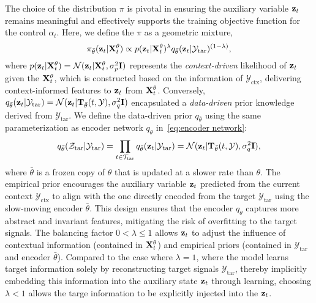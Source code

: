The choice of the distribution $\pi$ is pivotal in ensuring the auxiliary variable $\mathbf{z}_t$ remains meaningful and effectively supports the training objective function for the control $\alpha_t$. Here, we define the $\pi$ as a geometric mixture,
\[\label{eq:mixture distribution}
    \pi_{\bar{\theta}}(\mathbf{z}_t | \mathbf{X}^{\theta}_t) \propto p(\mathbf{z}_t | \mathbf{X}^{\theta}_t)^{\lambda} q_{\bar{\theta}}(\mathbf{z}_t | \mathcal{Y}_{\text{tar}})^{(1-\lambda)},
\]
where $p(\mathbf{z}_t | \mathbf{X}^{\theta}_t) = \mathcal{N}(\mathbf{z}_t | \mathbf{X}^{\theta}_t, \sigma^2_p \mathbf{I})$ represents the \textit{context-driven} likelihood of $\mathbf{z}_t$ given the $\mathbf{X}^{\theta}_t$, which is constructed based on the information of $\mathcal{Y}_{\text{ctx}}$, delivering context-informed features to $\mathbf{z}_t$ from $\mathbf{X}_t^\theta$. Conversely, $q_{\bar{\theta}}(\mathbf{z}_t | \mathcal{Y}_{\text{tar}}) = \mathcal{N}(\mathbf{z}_t | \mathbf{T}_{\bar{\theta}}(t, \mathcal{Y}), \sigma^2_q \mathbf{I})$ encapsulated a \textit{data-driven} prior knowledge derived from $\mathcal{Y}_{\text{tar}}$. We define the data-driven prior $q_{\bar{\theta}}$ using the same parameterization as encoder network $q_{\theta}$ in~\eqref{eq:encoder network}:
\[\nonumber
    q_{\bar{\theta}}(\mathcal{Z}_{\text{tar}} | \mathcal{Y}_{\text{tar}}) = \prod_{t \in \mathcal{T}_{\text{tar}}}q_{\bar{\theta}}(\mathbf{z}_t | \mathcal{Y}_{\text{tar}}) = \mathcal{N}(\mathbf{z}_t | \mathbf{T}_{\bar{\theta}}(t, \mathcal{Y}), \sigma^2_q \mathbf{I}),
\]
where $\bar{\theta}$ is a frozen copy of $\theta$ that is updated at a slower rate than $\theta$. The empirical prior encourages the auxiliary variable $\mathbf{z}_t$ predicted from the current context $\mathcal{Y}_\text{ctx}$ to align with the one directly encoded from the target $\mathcal{Y}_\text{tar}$ using the slow-moving encoder $\bar{\theta}$. This design ensures that the encoder $q_\theta$ captures more abstract and invariant features, mitigating the risk of overfitting to the target signals. The balancing factor $0 < \lambda \leq 1$ allows $\mathbf{z}_t$ to adjust the influence of contextual information (contained in $\mathbf{X}^{\theta}_t$) and empirical priors (contained in $\mathcal{Y}_{\text{tar}}$ and encoder $\bar{\theta}$). Compared to the case where $\lambda=1$, where the model learns target information solely by reconstructing target signals $\mathcal{Y}_{\text{tar}}$, thereby implicitly embedding this information into the auxiliary state $\mathbf{z}_t$ through learning, choosing $\lambda < 1$ allows the targe information to be explicitly injected into the $\mathbf{z}_t$.

